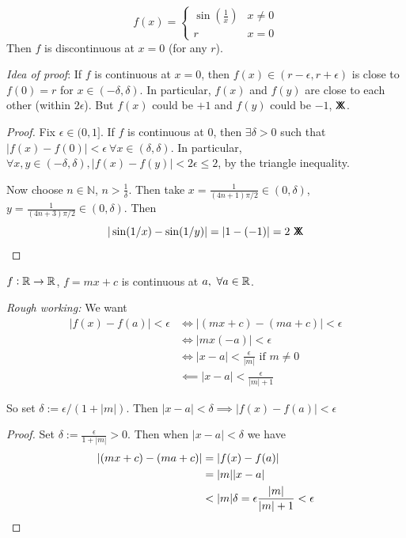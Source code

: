 \documentclass[10pt,twoside]{scrartcl}
\newcommand*{\cont}{%
  \mathsf{X}\mkern-8.5mu\mathsf{X}%
}
\begin{document}
\begin{example}
\[f(x) = \begin{cases}
 \sin(\frac{1}{x}) & x \neq 0\\
 r & x = 0	
 \end{cases}
\] Then $f$ is discontinuous at $x = 0$ (for any $r$).	

\begin{center}
\end{center}

\emph{Idea of proof}: If $f$ is continuous at $x = 0$, then $f(x) \in (r-\epsilon, r + \epsilon)$ is close to $f(0) = r$ for $x \in (- \delta, \delta).$ In particular, $f(x)$ and $f(y)$ are close to each other (within $2\epsilon$). But $f(x)$ could be $+1$ and $f(y)$ could be $-1$, $\cont$.
\begin{proof}
Fix $\epsilon \in (0,1]$. If $f$ is continuous at $0$, then $\exists \delta > 0$ such that $|f(x) - f(0)| < \epsilon~\forall x \in (\delta,\delta)$. In particular, $\forall x,y \in (-\delta, \delta), |f(x) - f(y)| < 2\epsilon \leq 2$, by the triangle inequality. 

Now choose $n \in \mathbb{N}$, $n > \frac{1}{\delta}$. Then take $x = \frac{1}{(4n+1)\pi/2} \in (0,\delta)$, $y = \frac{1}{(4n+3)\pi/2} \in (0,\delta)$. Then 
\[|\sin(1/x) - \sin(1/y)| = |1 - (-1)| = 2 ~\cont\qedhere\]
\end{proof}

\end{example}\vspace*{5pt}


\begin{example}
$f: \mathbb{R} \to \mathbb{R}$, $f = mx + c$ is continuous at $a, ~\forall a \in\mathbb{R}$. 

\emph{Rough working:} We want 
\begin{align*}|f(x) - f(a)| < \epsilon &\iff |(mx+c) - (ma + c)|  < \epsilon \\
&\iff |mx(-a)| < \epsilon\\
&\iff |x-a| < \frac{\epsilon}{|m|} \text{ if } m \neq 0 \\
&\impliedby |x-a| < \frac{\epsilon}{|m|+1} 
\end{align*}

So set $\delta:= \epsilon / (1 + |m|)$. Then $|x-a| < \delta \implies |f(x) - f(a)| < \epsilon$
\begin{proof}
Set $\delta:= \frac{\epsilon }{1 + |m|} > 0$. Then when $|x-a| < \delta$ we have  
\begin{align*}
|(mx+ c) - (ma +c)| &= |f(x) - f(a)| \\
&= |m||x-a| \\
&< |m|\delta = \epsilon \frac{|m|}{|m|+1} < \epsilon	\qedhere
\end{align*}
\end{proof}
\end{example}\vspace*{5pt}
\end{document}

